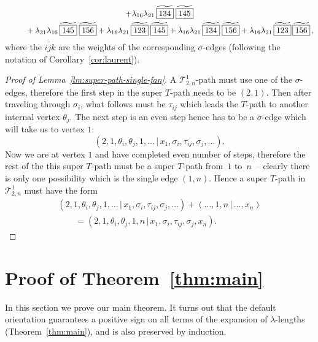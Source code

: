 \begin{Example}
\begin{gather*}
 + \lambda_{16}\lambda_{21} \, \widetilde{\boxed{134}} \; \widetilde{\boxed{145} }\\
 \hphantom{\lambda_{26} =}{}
 + \lambda_{21}\lambda_{16}\, \widetilde{\boxed{145}} \; \widetilde{\boxed{156} }
 + \lambda_{16}\lambda_{21} \, \widetilde{\boxed{123}} \; \widetilde{ \boxed{145}}
 + \lambda_{16}\lambda_{21} \, \widetilde{\boxed{134}}\;\widetilde{\boxed{156}}
 + \lambda_{16}\lambda_{21}\,
 \widetilde{ \boxed{123} }\, \widetilde{ \boxed{156}}\,,
 \end{gather*}
 where the $\widetilde{\boxed{ijk}}$ are the weights of the corresponding $\sigma$-edges (following the notation of Corollary~\ref{cor:laurent}).
\end{Example}

\begin{proof}[Proof of Lemma~\ref{lm:super-path-single-fan}]
 A $\mathcal T^1_{2,n}$-path must use one of the $\sigma$-edges, therefore the first step in the super $T$-path needs to be $(2,1)$.
 Then after traveling through $\sigma_i$, what follows must be $\tau_{ij}$ which leads the $T$-path to another internal vertex $\theta_j$.
 The next step is an even step hence has to be a $\sigma$-edge which will take us to vertex $1$:
 \[(2,1,\theta_i,\theta_j,1,\dots\,|\,x_1,\sigma_i,\tau_{ij},\sigma_j,\dots).\]
 Now we are at vertex $1$ and have completed even number of steps, therefore the rest of the this super $T$-path must be a super $T$-path
 from~$1$ to~$n$~-- clearly there is only one possibility which is the single edge $(1,n)$.
 Hence a super $T$-path in $\mathcal T^1_{2,n}$ must have the form
 \begin{gather*}
 (2,1,\theta_i,\theta_j,1,\dots\,|\,x_1,\sigma_i,\tau_{ij},\sigma_j,\dots)+(\dots,1,n\,|\,\dots,x_n)\\
 \qquad{} =(2,1,\theta_i,\theta_j,1,n\,|\,x_1,\sigma_i,\tau_{ij},\sigma_j,x_n).\tag*{\qed}
 \end{gather*}\renewcommand{\qed}{}
\end{proof}

\section{Proof of Theorem~\ref{thm:main}}
\label{sec:proof}

In this section we prove our main theorem.
It turns out that the default orientation guarantees a positive sign on all terms of the expansion of
$\lambda$-lengths (Theorem~\ref{thm:main}), and is also preserved by induction.

